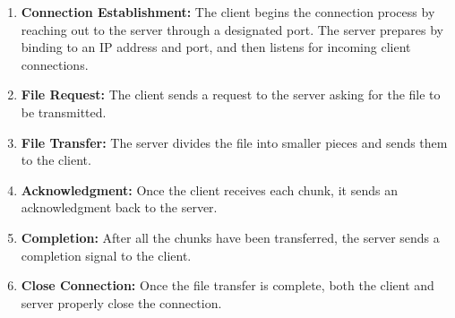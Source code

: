\documentclass[a4paper,12pt]{article}
\begin{document}
\begin{enumerate}
    \item \textbf{Connection Establishment:} The client begins the connection process by reaching out to the server through a designated port. The server prepares by binding to an IP address and port, and then listens for incoming client connections.
    \item \textbf{File Request:} The client sends a request to the server asking for the file to be transmitted.
    \item \textbf{File Transfer:} The server divides the file into smaller pieces and sends them to the client.
    \item \textbf{Acknowledgment:} Once the client receives each chunk, it sends an acknowledgment back to the server.
    \item \textbf{Completion:} After all the chunks have been transferred, the server sends a completion signal to the client.
    \item \textbf{Close Connection:} Once the file transfer is complete, both the client and server properly close the connection.
\end{enumerate}
\end{document}
